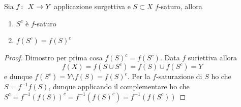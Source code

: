 \begin{lemma}
	Sia $f \colon\ X \rightarrow Y$ applicazione surgettiva e $S \subset X$ $f$-saturo, allora 
	\begin{enumerate}
		\item $S^c$ è $f$-saturo 
		\item $f(S^c) = f(S)^c$
	\end{enumerate}
\end{lemma}
\begin{proof}
	Dimostro per prima cosa $f(S)^c = f(S^c)$. Data $f$ suriettiva allora 
	\begin{equation*}
		f(X) = f(S \cup S^c) = f(S) \cup f(S^c) = Y
	\end{equation*}
	e dunque $f(S^c) = Y \setminus f(S) = f(S)^c$. 
	Per la $f$-saturazione di $S$ ho che $S = f^{-1}f(S)$, dunque applicando il complementare ho che $S^c = f^{-1}(f(S))^c = f^{-1}(f(S)^c) = f^{-1}(f(S^c))$
\end{proof}

